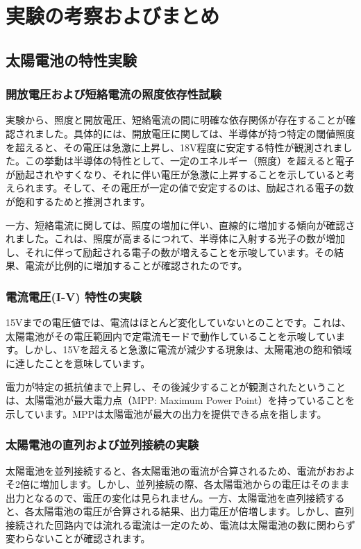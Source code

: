 \documentclass[a4paper,11pt,xelatex,ja=standard]{bxjsarticle}
\begin{document}
        
\section{実験の考察およびまとめ}
    \subsection{太陽電池の特性実験}
        \subsubsection{開放電圧および短絡電流の照度依存性試験}
            実験から、照度と開放電圧、短絡電流の間に明確な依存関係が存在することが確認されました。具体的には、開放電圧に関しては、半導体が持つ特定の閾値照度を超えると、その電圧は急激に上昇し、18V程度に安定する特性が観測されました。この挙動は半導体の特性として、一定のエネルギー（照度）を超えると電子が励起されやすくなり、それに伴い電圧が急激に上昇することを示していると考えられます。そして、その電圧が一定の値で安定するのは、励起される電子の数が飽和するためと推測されます。

            一方、短絡電流に関しては、照度の増加に伴い、直線的に増加する傾向が確認されました。これは、照度が高まるにつれて、半導体に入射する光子の数が増加し、それに伴って励起される電子の数が増えることを示唆しています。その結果、電流が比例的に増加することが確認されたのです。
        \subsubsection{電流電圧(I-V) 特性の実験}
            15Vまでの電圧値では、電流はほとんど変化していないとのことです。これは、太陽電池がその電圧範囲内で定電流モードで動作していることを示唆しています。しかし、15Vを超えると急激に電流が減少する現象は、太陽電池の飽和領域に達したことを意味しています。
        
            電力が特定の抵抗値まで上昇し、その後減少することが観測されたということは、太陽電池が最大電力点（MPP: Maximum Power Point）を持っていることを示しています。MPPは太陽電池が最大の出力を提供できる点を指します。
        \subsubsection{太陽電池の直列および並列接続の実験}
            太陽電池を並列接続すると、各太陽電池の電流が合算されるため、電流がおおよそ2倍に増加します。しかし、並列接続の際、各太陽電池からの電圧はそのまま出力となるので、電圧の変化は見られません。一方、太陽電池を直列接続すると、各太陽電池の電圧が合算される結果、出力電圧が倍増します。しかし、直列接続された回路内では流れる電流は一定のため、電流は太陽電池の数に関わらず変わらないことが確認されます。
        
\end{document}

